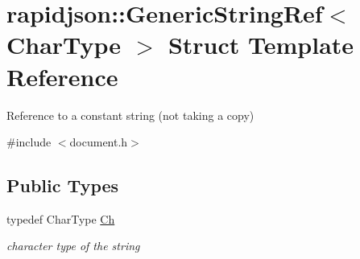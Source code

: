 \hypertarget{structrapidjson_1_1_generic_string_ref}{}\section{rapidjson\+::Generic\+String\+Ref$<$ Char\+Type $>$ Struct Template Reference}
\label{structrapidjson_1_1_generic_string_ref}


Reference to a constant string (not taking a copy)  




{\ttfamily \#include $<$document.\+h$>$}

\subsection*{Public Types}
\begin{DoxyCompactItemize}
\item 
typedef Char\+Type \mbox{\hyperlink{structrapidjson_1_1_generic_string_ref_aa2a8eccae3d7eb14c30bc21afb7d6fba}{Ch}}
\begin{DoxyCompactList}\small\item\em character type of the string \end{DoxyCompactList}\end{DoxyCompactItemize}

